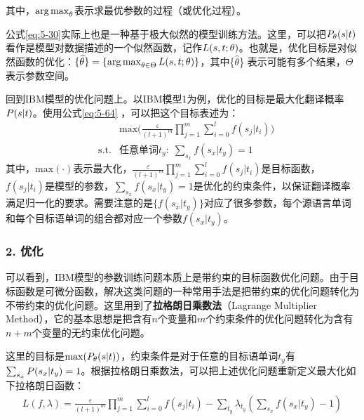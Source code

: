 \noindent 其中，$\operatorname*{arg\,max}_{\theta}$表示求最优参数的过程（或优化过程）。

\parinterval 公式\eqref{eq:5-30}实际上也是一种基于极大似然的模型训练方法。这里，可以把${P}_{\theta}({s}|{t})$看作是模型对数据描述的一个似然函数，记作$L({s},{t};\theta)$。也就是，优化目标是对似然函数的优化：$\{\widehat{\theta}\}=\{\operatorname*{arg\,max}_{\theta \in \Theta}L({s},{t};\theta)\}$，其中\{$\widehat{\theta}$\} 表示可能有多个结果，$\Theta$表示参数空间。

\parinterval 回到IBM模型的优化问题上。以IBM模型1为例，优化的目标是最大化翻译概率${P}({s}| {t})$。使用公式\eqref{eq:5-64} ，可以把这个目标表述为：
\begin{eqnarray}
&                    & \textrm{max}\Big(\frac{\varepsilon}{(l+1)^m}\prod_{j=1}^{m}\sum_{i=0}^{l}{f({s_j|t_i})}\Big) \nonumber \\
& \textrm{s.t.} & \textrm{任意单词} t_{y}:\;\sum_{s_x}{f(s_x|t_y)}=1 \nonumber
\label{eq:5-31}
\end{eqnarray}
\noindent 其中，$\textrm{max}(\cdot)$表示最大化，$\frac{\varepsilon}{(l+1)^m}\prod_{j=1}^{m}\sum_{i=0}^{l}{f({s_j|t_i})}$是目标函数，$f({s_j|t_i})$是模型的参数，$\sum_{s_x}{f(s_x|t_y)}=1$是优化的约束条件，以保证翻译概率满足归一化的要求。需要注意的是$\{f(s_x |t_y)\}$对应了很多参数，每个源语言单词和每个目标语单词的组合都对应一个参数$f(s_x |t_y)$。


\subsubsection {2. 优化}

\parinterval 可以看到，IBM模型的参数训练问题本质上是带约束的目标函数优化问题。由于目标函数是可微分函数，解决这类问题的一种常用手法是把带约束的优化问题转化为不带约束的优化问题。这里用到了{\small\sffamily\bfseries{拉格朗日乘数法}}（Lagrange Multiplier Method），它的基本思想是把含有$n$个变量和$m$个约束条件的优化问题转化为含有$n+m$个变量的无约束优化问题。

\parinterval 这里的目标是$\max({P}_{\theta}({s}|{t}))$，约束条件是对于任意的目标语单词$t_y$有\\$\sum_{s_x}{{P}(s_x|t_y)}=1$。根据拉格朗日乘数法，可以把上述优化问题重新定义最大化如下拉格朗日函数：
\vspace{-0.5em}
\begin{eqnarray}
L(f,\lambda)=\frac{\varepsilon}{(l+1)^m}\prod_{j=1}^{m}\sum_{i=0}^{l}{f(s_j|t_i)}-\sum_{t_y}{\lambda_{t_y}(\sum_{s_x}{f(s_x|t_y)}-1)}
\label{eq:5-32}
\end{eqnarray}

